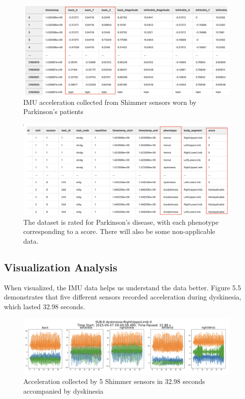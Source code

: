 \begin{figure}[htbp]
    \centering
    \includegraphics[width=13cm]{report/pics/X.png}
     \caption{IMU acceleration collected from Shimmer sensors worn by Parkinson's patients \cite{MJFF}}
    \label{fig:my_label}
\end{figure}


\begin{figure}[htbp]
    \centering
    \includegraphics[width=13cm]{report/pics/Y.png}
    \caption{The dataset is rated for Parkinson's disease, with each phenotype corresponding to a score. There will also be some non-applicable data. \cite{MJFF}}
    \label{fig:my_label}
\end{figure}











\subsection{Visualization Analysis}
When visualized, the IMU data helps us understand the data better. Figure 5.5 demonstrates that five different sensors recorded acceleration during dyskinesia, which lasted 32.98 seconds.
\begin{figure}[htbp]
    \centering
    \includegraphics[width=13cm]{report/pics/dyskinesia-RightUpperLimb.png}
    \caption{Acceleration collected by 5 Shimmer sensors in 32.98 seconds accompanied by dyskinesia \cite{MJFF}}
    \label{fig:my_label}
\end{figure}\\

